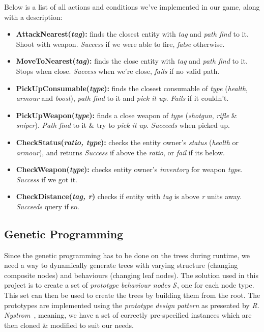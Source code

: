 \documentclass[a4paper, twocolumn]{article}
\begin{document}
        Below is a list of all actions and conditions we've implemented in our game, along with a description:

        \begin{itemize}
            \item{\textbf{AttackNearest(\emph{tag}):} finds the closest entity with \emph{tag} and \emph{path find} to it. Shoot with weapon. \emph{Success} if we were able to fire, \emph{false} otherwise.}
            \item{\textbf{MoveToNearest(\emph{tag}):} finds the close entity with \emph{tag} and \emph{path find} to it. Stops when close. \emph{Success} when we're close, \emph{fails} if no valid path.}
            \item{\textbf{PickUpConsumable(\emph{type}):} finds the closest consumable of \emph{type} (\emph{health}, \emph{armour} and \emph{boost}), \emph{path find} to it and \emph{pick it up}. \emph{Fails} if it couldn't.}
            \item{\textbf{PickUpWeapon(\emph{type}):} finds a close weapon of \emph{type} (\emph{shotgun}, \emph{rifle} \& \emph{sniper}). \emph{Path find} to it \& try to \emph{pick it up}. \emph{Succeeds} when picked up.}
        \end{itemize}
        \begin{itemize}
            \item{\textbf{CheckStatus(\emph{ratio, type}):} checks the entity owner's \emph{status} (\emph{health} or \emph{armour}), and returns \emph{Success} if above the \emph{ratio}, or \emph{fail} if its below.}
            \item{\textbf{CheckWeapon(\emph{type}):} checks entity owner's \emph{inventory} for weapon \emph{type}. \emph{Success} if we got it.}
            \item{\textbf{CheckDistance(\emph{tag, r})} checks if entity with \emph{tag} is above \emph{r} units away. \emph{Succeeds} query if so.}
        \end{itemize}

        \clearpage

        \subsection{Genetic Programming} \label{sec:genetic_programming_implementation}

        Since the genetic programming has to be done on the trees during runtime, we need a way to dynamically generate trees with varying structure (changing composite nodes) and behaviours (changing leaf nodes). The solution used in this project is to create a set of \textit{prototype behaviour nodes} \(\mathcal{S}\), one for each node type. This set can then be used to create the trees by building them from the root. The prototypes are implemented using the \textit{prototype design pattern} as presented by \textit{R. Nystrom}~\cite{nystrom2014game}, meaning, we have a set of correctly pre-specified instances which are then cloned \& modified to suit our needs.
\end{document}
